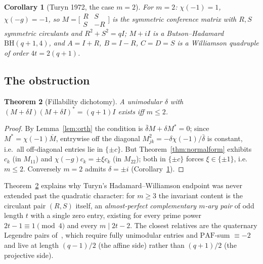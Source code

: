 \documentclass[11pt]{article}
\theoremstyle{plain}
\newtheorem{theorem}{Theorem}[section]
\newtheorem{corollary}[theorem]{Corollary}
\theoremstyle{definition}
\theoremstyle{remark}
\newcommand{\paf}{\mathrm{PAF}}
\begin{document}
\begin{corollary}[Turyn 1972, the case $m=2$]\label{cor:turyn2}
For $m=2$: $\chi(-1)=1$, $\chi(-g)=-1$, so $M=\bigl[\begin{smallmatrix}R&S\\
S&-R\end{smallmatrix}\bigr]$ is the symmetric conference matrix with $R,S$
symmetric circulants and $R^2+S^2=qI$; $M+iI$ is a Butson--Hadamard
$\mathrm{BH}(q+1,4)$, and $A=I+R$, $B=I-R$, $C=D=S$ is a Williamson quadruple of
order $4t=2(q+1)$.
\end{corollary}

\subsection{The obstruction}

\begin{theorem}[Fillability dichotomy]\label{thm:dichotomy}
A unimodular $\delta$ with $(M+\delta I)(M+\delta I)^*=(q+1)I$ exists iff $m\le2$.
\end{theorem}

\begin{proof}
By Lemma~\ref{lem:orth} the condition is $\bar\delta M+\delta M^*=0$; since
$M^*=\chi(-1)\overline M$, entrywise off the diagonal
$M_{jk}^2=-\delta\chi(-1)/\bar\delta$ is constant, i.e.\ all off-diagonal
entries lie in $\{\pm c\}$. But Theorem~\ref{thm:normalform} exhibits $c_k$ (in
$M_{11}$) and $\chi(-g)c_k=\pm\xi c_k$ (in $M_{22}$); both in $\{\pm c\}$ forces
$\xi\in\{\pm1\}$, i.e.\ $m\le2$. Conversely $m=2$ admits $\delta=\pm i$
(Corollary~\ref{cor:turyn2}).
\end{proof}

Theorem~\ref{thm:dichotomy} explains why Turyn's Hadamard--Williamson endpoint
was never extended past the quadratic character: for $m\ge3$ the invariant
content is the circulant pair $(R,S)$ itself, an \emph{almost-perfect
complementary $m$-ary pair} of odd length $t$ with a single zero entry, existing
for every prime power $2t-1\equiv1\pmod4$ and every $m\mid2t-2$. The closest
relatives are the quaternary Legendre pairs of~\cite{JP24,KKW24}, which require
fully unimodular entries and $\paf$-sum $\equiv-2$ and live at length $(q-1)/2$
(the affine side) rather than $(q+1)/2$ (the projective side).
\end{document}
